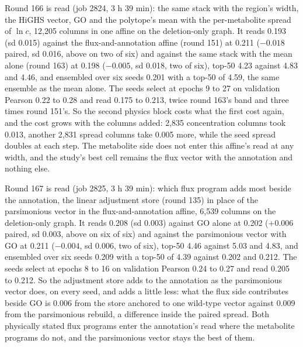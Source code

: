 Round 166 is read (job 2824, 3 h 39 min): the same stack with the region's width, the
HiGHS vector, GO and the polytope's mean with the per-metabolite spread of $\ln c$,
12,205 columns in one affine on the deletion-only graph. It reads 0.193 (sd 0.015)
against the flux-and-annotation affine (round 151) at 0.211 ($-0.018$ paired, sd 0.016,
above on two of six) and against the same stack with the mean alone (round 163) at
0.198 ($-0.005$, sd 0.018, two of six), top-50 4.23 against 4.83 and 4.46, and
ensembled over six seeds 0.201 with a top-50 of 4.59, the same ensemble as the mean
alone. The seeds select at epochs 9 to 27 on validation Pearson 0.22 to 0.28 and read
0.175 to 0.213, twice round 163's band and three times round 151's. So the second
physics block costs what the first cost again, and the cost grows with the columns
added: 2,835 concentration columns took 0.013, another 2,831 spread columns take 0.005
more, while the seed spread doubles at each step. The metabolite side does not enter
this affine's read at any width, and the study's best cell remains the flux vector with
the annotation and nothing else.

Round 167 is read (job 2825, 3 h 39 min): which flux program adds most beside the
annotation, the linear adjustment store (round 135) in place of the parsimonious vector
in the flux-and-annotation affine, 6,539 columns on the deletion-only graph. It reads
0.208 (sd 0.003) against GO alone at 0.202 ($+0.006$ paired, sd 0.003, above on six of
six) and against the parsimonious vector with GO at 0.211 ($-0.004$, sd 0.006, two of
six), top-50 4.46 against 5.03 and 4.83, and ensembled over six seeds 0.209 with a
top-50 of 4.39 against 0.202 and 0.212. The seeds select at epochs 8 to 16 on validation
Pearson 0.24 to 0.27 and read 0.205 to 0.212. So the adjustment store adds to the
annotation as the parsimonious vector does, on every seed, and adds a little less: what
the flux side contributes beside GO is 0.006 from the store anchored to one wild-type
vector against 0.009 from the parsimonious rebuild, a difference inside the paired
spread. Both physically stated flux programs enter the annotation's read where the
metabolite programs do not, and the parsimonious vector stays the best of them.

